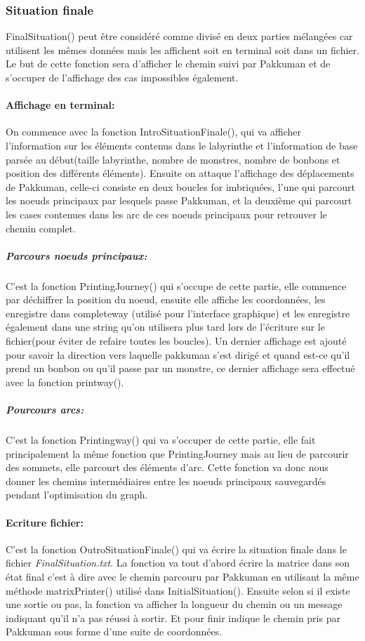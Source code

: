 \documentclass[12pt, oneside]{article}
\begin{document}
\subsubsection{Situation finale}
Final\textunderscore Situation() peut être considéré comme divisé en deux parties mélangées car utilisent les mêmes données mais les affichent soit en terminal soit dans un fichier. Le but de cette fonction sera d'afficher le chemin suivi par Pakkuman et de s'occuper de l'affichage des cas impossibles également.

\paragraph{Affichage en terminal:}
On commence avec la fonction Intro\textunderscore SituationFinale(), qui va afficher l'information sur les éléments contenus dans le labyrinthe et l'information de base parsée au début(taille labyrinthe, nombre de monstres, nombre de bonbons et position des différents éléments).
Ensuite on attaque l'affichage des déplacements de Pakkuman, celle-ci consiste en deux boucles for imbriquées, l'une qui parcourt les noeuds principaux par lesquels passe Pakkuman, et la deuxième qui parcourt les cases contenues dans les arc de ces noeuds principaux pour retrouver le chemin complet.

\subparagraph{Parcours noeuds principaux:}
C'est la fonction Printing\textunderscore Journey() qui s'occupe de cette partie, elle commence par déchiffrer la position du noeud, ensuite elle affiche les coordonnées, les enregistre dans complete\textunderscore way (utilisé pour l'interface graphique) et les enregistre également dans une string qu'on utilisera plus tard lors de l'écriture sur le fichier(pour éviter de refaire toutes les boucles). Un dernier affichage est ajouté pour savoir la direction vers laquelle pakkuman s'est dirigé et quand est-ce qu'il prend un bonbon ou qu'il passe par un monstre, ce dernier affichage sera effectué avec la fonction print\textunderscore way().

\subparagraph{Pourcours arcs:}
C'est la fonction Printing\textunderscore way() qui va s'occuper de cette partie, elle fait principalement la même fonction que Printing\textunderscore Journey mais au lieu de parcourir des sommets, elle parcourt des éléments d'arc.
Cette fonction va donc nous donner les chemins intermédiaires entre les noeuds principaux sauvegardés pendant l'optimisation du graph.

\paragraph{Ecriture fichier:}
C'est la fonction Outro\textunderscore SituationFinale() qui va écrire la situation finale dans le fichier \emph{FinalSituation.txt}. La fonction va tout d'abord écrire la matrice dans son état final c'est à dire avec le chemin parcouru par Pakkuman en utilisant la même méthode matrix\textunderscore Printer() utilisé dans Initial\textunderscore Situation(). Ensuite selon si il existe une sortie ou pas, la fonction va afficher la longueur du chemin ou un message indiquant qu'il n'a pas réussi à sortir. Et pour finir indique le chemin pris par Pakkuman sous forme d'une suite de coordonnées.
\end{document}
